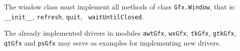 \documentclass[12pt,a4paper,USenglish]{article}
\begin{document}
The window class must implement all methods of class {\tt Gfx.Window},
that is: {\tt \_\_init\_\_}, {\tt refresh}, {\tt quit}, {\tt
  waitUntilClosed}.

The already implemented drivers in modules {\tt awtGfx}, {\tt wxGfx},
{\tt tkGfx}, {\tt gtkGfx}, {\tt qtGfx} and {\tt psGfx} may serve as examples for
implementing new drivers.
\end{document}
